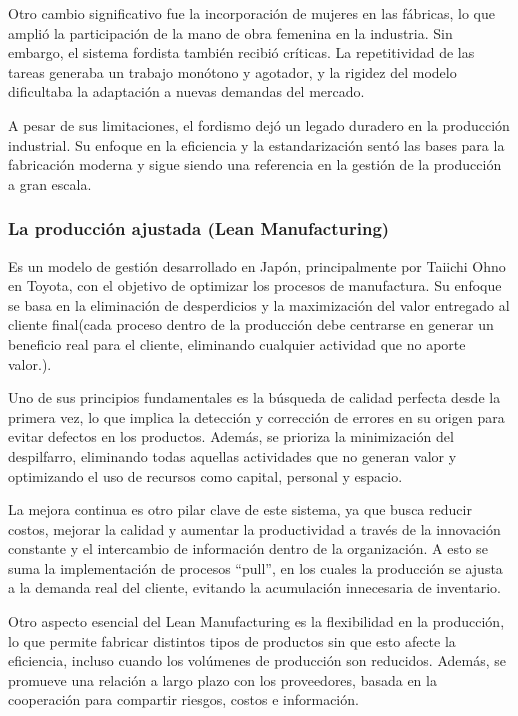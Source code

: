 \documentclass[a4paper,oneside,11pt]{article}
\begin{document}
\begin{enumerate}
        Otro cambio significativo fue la incorporación de mujeres en las fábricas, lo que amplió la participación de la mano de obra femenina en la industria. Sin embargo, el sistema fordista también recibió críticas. La repetitividad de las tareas generaba un trabajo monótono y agotador, y la rigidez del modelo dificultaba la adaptación a nuevas demandas del mercado.
        
        A pesar de sus limitaciones, el fordismo dejó un legado duradero en la producción industrial. Su enfoque en la eficiencia y la estandarización sentó las bases para la fabricación moderna y sigue siendo una referencia en la gestión de la producción a gran escala.

\end{enumerate}

\subsubsection{La producción ajustada (Lean Manufacturing)}

Es un modelo de gestión desarrollado en Japón, principalmente por Taiichi Ohno en Toyota, con el objetivo de optimizar los procesos de manufactura. Su enfoque se basa en la eliminación de desperdicios y la maximización del valor entregado al cliente final(cada proceso dentro de la producción debe centrarse en generar un beneficio real para el cliente, eliminando cualquier actividad que no aporte valor.).

Uno de sus principios fundamentales es la búsqueda de calidad perfecta desde la primera vez, lo que implica la detección y corrección de errores en su origen para evitar defectos en los productos. Además, se prioriza la minimización del despilfarro, eliminando todas aquellas actividades que no generan valor y optimizando el uso de recursos como capital, personal y espacio.

La mejora continua es otro pilar clave de este sistema, ya que busca reducir costos, mejorar la calidad y aumentar la productividad a través de la innovación constante y el intercambio de información dentro de la organización. A esto se suma la implementación de procesos “pull”, en los cuales la producción se ajusta a la demanda real del cliente, evitando la acumulación innecesaria de inventario.

Otro aspecto esencial del Lean Manufacturing es la flexibilidad en la producción, lo que permite fabricar distintos tipos de productos sin que esto afecte la eficiencia, incluso cuando los volúmenes de producción son reducidos. Además, se promueve una relación a largo plazo con los proveedores, basada en la cooperación para compartir riesgos, costos e información.
\end{document}
